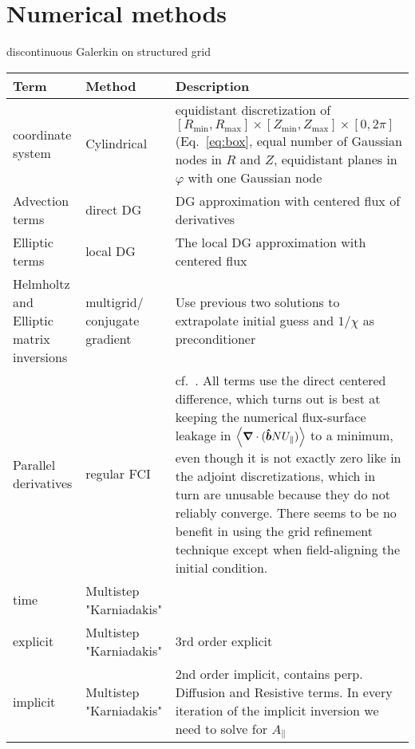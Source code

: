 \section{Numerical methods}
discontinuous Galerkin on structured grid
\begin{longtable}{p{3cm}p{3cm}p{8cm}}
\toprule
\rowcolor{gray!50}\textbf{Term} &  \textbf{Method} & \textbf{Description}  \\ \midrule
    coordinate system & Cylindrical & equidistant discretization of $[R_{\min},R_{\max}] \times [Z_{\min},Z_{\max}] \times [0,2\pi]$ (Eq.~\eqref{eq:box}, equal number of Gaussian nodes in $R$ and $Z$, equidistant planes in $\varphi$ with one Gaussian node \\
Advection terms & direct DG & DG approximation with centered flux of derivatives \\
Elliptic terms & local DG & The local DG approximation with centered flux \\
Helmholtz and Elliptic matrix inversions & multigrid/ conjugate gradient & Use previous two solutions to extrapolate initial guess and $1/\chi$ as preconditioner \\
Parallel derivatives & regular  FCI & cf.~\cite{Held2016,Stegmeir2017}.
All terms use the direct centered difference, which turns out is best
at keeping the numerical flux-surface leakage in $\left \langle {\boldsymbol{\nabla}}\cdot ( \bm{\hat{b}} NU_\parallel) \right \rangle$ to a minimum, even
though it is not exactly zero like in the adjoint discretizations, which in turn are unusable because they do not reliably converge.
There seems to be no benefit in using the grid refinement technique except when field-aligning the initial condition.
\\
time & Multistep "Karniadakis" & \\
\qquad explicit & Multistep "Karniadakis" & $3$rd order explicit\\
\qquad implicit & Multistep "Karniadakis" & $2$nd order implicit, contains perp. Diffusion and Resistive terms. In every iteration of the implicit inversion we need to solve for $A_\parallel$\\
\bottomrule
\end{longtable}

